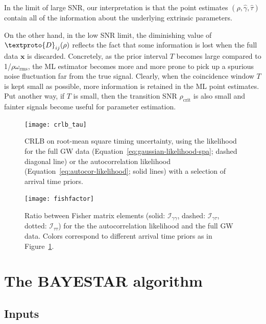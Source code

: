 \documentclass{iopart}
\begin{document}
In the limit of large SNR, our interpretation is that the point estimates $(\hat\rho, \hat\gamma, \hat\tau)$ contain all of the information about the underlying extrinsic parameters.

On the other hand, in the low SNR limit, the diminishing value of $\textproto{D}_{ij}(\rho)$ reflects the fact that some information is lost when the full data $\mathbf{x}$ is discarded. Concretely, as the prior interval $T$ becomes large compared to 1/$\rho\omega_\mathrm{rms}$, the ML estimator becomes more and more prone to pick up a spurious noise fluctuation far from the true signal. Clearly, when the coincidence window $T$ is kept small as possible, more information is retained in the ML point estimates. Put another way, if $T$ is small, then the transition SNR $\rho_\mathrm{crit}$ is also small and fainter signals become useful for parameter estimation.

\begin{figure}
    \begin{center}
        \texttt{[image: crlb\_tau]}
    \end{center}
    \caption{\label{fig:crlb-tau}\ac{CRLB} on root\nobreakdashes-mean square timing uncertainty, using the likelihood for the full GW data (Equation~\ref{eq:gaussian-likelihood-spa}; dashed diagonal line) or the autocorrelation likelihood (Equation~\ref{eq:autocor-likelihood}; solid lines) with a selection of arrival time priors.}
\end{figure}

\begin{figure}
    \begin{center}
        \texttt{[image: fishfactor]}
    \end{center}
    \caption{\label{fig:fishfactor}Ratio between Fisher matrix elements (solid: $\mathcal{I}_{\gamma\gamma}$, dashed: $\mathcal{I}_{\gamma\tau}$, dotted: $\mathcal{I}_{\tau\tau}$) for the the autocorrelation likelihood and the full GW data. Colors correspond to different arrival time priors as in Figure~\ref{fig:crlb-tau}.}
\end{figure}

\section{The \ac{BAYESTAR} algorithm}

\subsection{Inputs}
\end{document}
